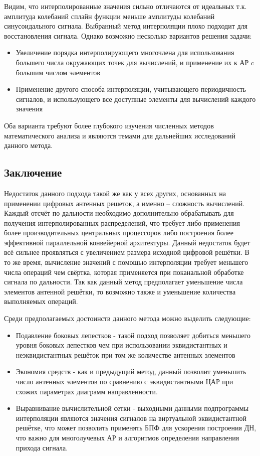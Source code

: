 Видим, что интерполированные значения сильно отличаются от идеальных т.к. амплитуда колебаний сплайн функции 
меньше амплитуды колебаний синусоидального сигнала. Выбранный метод интерполяции 
плохо подходит для восстановления сигнала. Однако возможно несколько вариантов решения задачи:

\begin{itemize}
    \item Увеличение порядка интерполирующего многочлена для использования большего числа окружающих 
    точек для вычислений, и применение их к АР c большим числом элементов
    \item Применение другого способа интерполяции, учитывающего периодичность сигналов, 
    и использующего все доступные элементы для вычислений каждого значения
\end{itemize}

Оба варианта требуют более глубокого изучения численных методов математического анализа и 
являются темами для дальнейших исследований данного метода.


\subsection{Заключение}

Недостаток данного подхода такой же как у всех других, основанных на применении цифровых антенных решеток, 
а именно -- сложность вычислений. Каждый отсчёт по дальности необходимо дополнительно обрабатывать для 
получения интерполированных распределений, что требует либо применения более производительных центральных процессоров 
либо построения более эффективной параллельной конвейерной архитектуры. Данный недостаток будет всё сильнее проявляться 
с увеличением размера исходной цифровой решётки. В то же время, вычисление значений с помощью интерполяции требует 
меньшего числа операций чем свёртка, которая применяется при поканальной обработке сигнала по дальности. 
Так как данный метод предполагает уменьшение числа элементов антенной решётки, то возможно 
также и уменьшение количества выполняемых операций.

Среди предполагаемых достоинств данного метода можно выделить следующие:

\begin{itemize}
    \item Подавление боковых лепестков - такой подход позволяет добиться меньшего уровня боковых лепестков чем при 
    использовании эквидистантных и неэквидистантных решёток при том же количестве антенных элементов
    \item Экономия средств - как и предыдущий метод, данный позволит уменьшить число антенных элементов по сравнению с 
    эквидистантными ЦАР при схожих параметрах диаграмм направленности.
    \item Выравнивание вычислительной сетки - выходными данными подпрограммы интерполяции являются значения сигналов на 
    виртуальной эквидистантной решётке, что может позволить применять БПФ для ускорения построения ДН, что важно для 
    многолучевых АР и алгоритмов определения направления прихода сигнала. 
\end{itemize}

